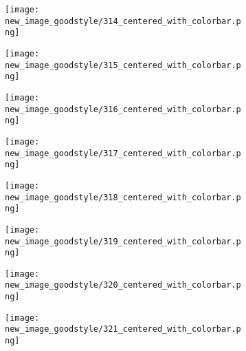 \documentclass[a4paper,12pt]{article}
\begin{document}
\begin{figure}[H]
  \begin{subfigure}{0.11\textwidth}
    \texttt{[image: new\_image\_goodstyle/314\_centered\_with\_colorbar.png]}
  \end{subfigure}
  \hfill
  \begin{subfigure}{0.11\textwidth}
    \texttt{[image: new\_image\_goodstyle/315\_centered\_with\_colorbar.png]}
  \end{subfigure}
  \hfill
  \begin{subfigure}{0.11\textwidth}
    \texttt{[image: new\_image\_goodstyle/316\_centered\_with\_colorbar.png]}
  \end{subfigure}
  \hfill
  \begin{subfigure}{0.11\textwidth}
    \texttt{[image: new\_image\_goodstyle/317\_centered\_with\_colorbar.png]}
  \end{subfigure}
  \hfill
  \begin{subfigure}{0.11\textwidth}
    \texttt{[image: new\_image\_goodstyle/318\_centered\_with\_colorbar.png]}
  \end{subfigure}
  \hfill
  \begin{subfigure}{0.11\textwidth}
    \texttt{[image: new\_image\_goodstyle/319\_centered\_with\_colorbar.png]}
  \end{subfigure}
  \hfill
  \begin{subfigure}{0.11\textwidth}
    \texttt{[image: new\_image\_goodstyle/320\_centered\_with\_colorbar.png]}
  \end{subfigure}
  \hfill
  \begin{subfigure}{0.11\textwidth}
    \texttt{[image: new\_image\_goodstyle/321\_centered\_with\_colorbar.png]}
  \end{subfigure}
  \hfill
\end{figure}
\end{document}

